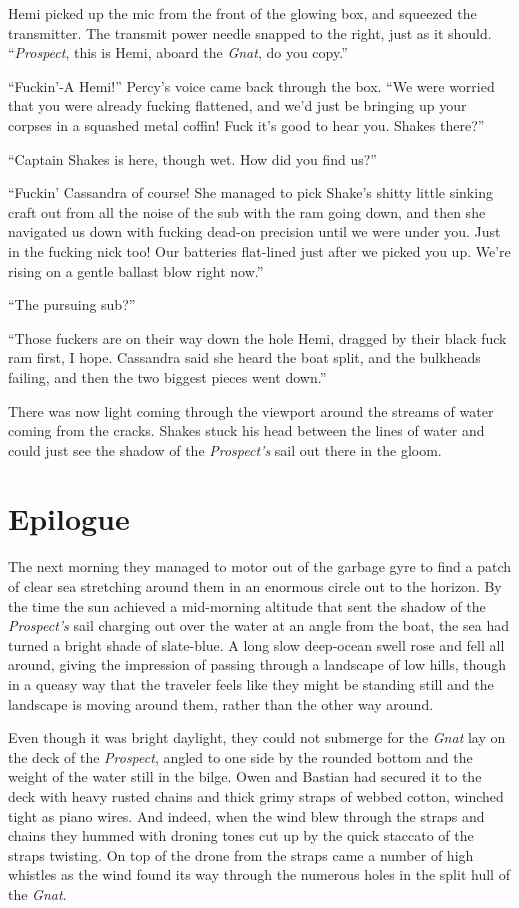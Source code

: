 \documentclass[
]{scrbook}
\begin{document}
Hemi picked up the mic from the front of the glowing box, and squeezed
the transmitter. The transmit power needle snapped to the right, just as
it should. ``\emph{Prospect}, this is Hemi, aboard the \emph{Gnat}, do
you copy.''

``Fuckin'-A Hemi!'' Percy's voice came back through the box. ``We were
worried that you were already fucking flattened, and we'd just be
bringing up your corpses in a squashed metal coffin! Fuck it's good to
hear you. Shakes there?''

``Captain Shakes is here, though wet. How did you find us?''

``Fuckin' Cassandra of course! She managed to pick Shake's shitty little
sinking craft out from all the noise of the sub with the ram going down,
and then she navigated us down with fucking dead-on precision until we
were under you. Just in the fucking nick too! Our batteries flat-lined
just after we picked you up. We're rising on a gentle ballast blow right
now.''

``The pursuing sub?''

``Those fuckers are on their way down the hole Hemi, dragged by their
black fuck ram first, I hope. Cassandra said she heard the boat split,
and the bulkheads failing, and then the two biggest pieces went down.''

There was now light coming through the viewport around the streams of
water coming from the cracks. Shakes stuck his head between the lines of
water and could just see the shadow of the \emph{Prospect's} sail out
there in the gloom.

\hypertarget{epilogue}{%
\chapter*{Epilogue}\label{epilogue}}

The next morning they managed to motor out of the garbage gyre to find a
patch of clear sea stretching around them in an enormous circle out to
the horizon. By the time the sun achieved a mid-morning altitude that
sent the shadow of the \emph{Prospect's} sail charging out over the
water at an angle from the boat, the sea had turned a bright shade of
slate-blue. A long slow deep-ocean swell rose and fell all around,
giving the impression of passing through a landscape of low hills,
though in a queasy way that the traveler feels like they might be
standing still and the landscape is moving around them, rather than the
other way around.

Even though it was bright daylight, they could not submerge for the
\emph{Gnat} lay on the deck of the \emph{Prospect}, angled to one side
by the rounded bottom and the weight of the water still in the bilge.
Owen and Bastian had secured it to the deck with heavy rusted chains and
thick grimy straps of webbed cotton, winched tight as piano wires. And
indeed, when the wind blew through the straps and chains they hummed
with droning tones cut up by the quick staccato of the straps twisting.
On top of the drone from the straps came a number of high whistles as
the wind found its way through the numerous holes in the split hull of
the \emph{Gnat}.
\end{document}
